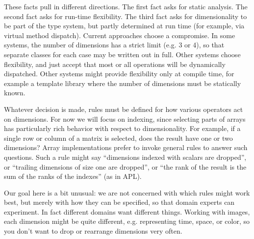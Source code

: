 These facts pull in different directions. The first fact asks for static
analysis. The second fact asks for run-time flexibility. The third fact asks
for dimensionality to be part of the type system, but partly determined
at run time (for example, via virtual method dispatch). Current approaches
choose a compromise. In some systems, the number of dimensions has a strict
limit (e.g. 3 or 4), so that separate classes for each case may be written
out in full. Other systems choose flexibility, and just accept that most
or all operations will be dynamically dispatched. Other systems might
provide flexibility only at compile time, for example a template library
where the number of dimensions must be statically known.



Whatever decision is made, rules must be defined for how various operators
act on dimensions. For now we will focus on indexing, since selecting
parts of arrays has particularly rich behavior with respect to
dimensionality. For example, if a single row or column of a matrix is
selected, does the result have one or two dimensions? Array implementations
prefer to invoke general rules to answer such questions. Such a rule might
say ``dimensions indexed with scalars are dropped'', or ``trailing
dimensions of size one are dropped'', or ``the rank of the result
is the sum of the ranks of the indexes'' (as in APL).

Our goal here is a bit unusual: we are not concerned with which rules
might work best, but merely with how they can be specified, so that
domain experts can experiment.
In fact different domains want different things. Working with images, each
dimension might be quite different, e.g. representing time, space, or color,
so you don't want to drop or rearrange dimensions very often.



